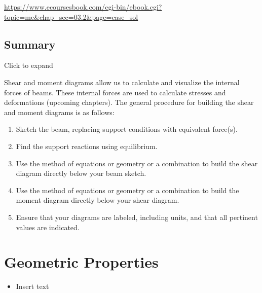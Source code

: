 \documentclass[
  letterpaper,
  DIV=11,
  numbers=noendperiod]{scrreprt}
\providecommand{\tightlist}{%
  \setlength{\itemsep}{0pt}\setlength{\parskip}{0pt}}\usepackage{longtable,booktabs,array}
\begin{document}
\url{https://www.ecoursesbook.com/cgi-bin/ebook.cgi?topic=me&chap_sec=03.2&page=case_sol}

\section*{Summary}\label{summary-3}


Click to expand

Shear and moment diagrams allow us to calculate and visualize the
internal forces of beams. These internal forces are used to calculate
stresses and deformations (upcoming chapters). The general procedure for
building the shear and moment diagrams is as follows:

\begin{enumerate}
\def\labelenumi{\arabic{enumi}.}
\tightlist
\item
  Sketch the beam, replacing support conditions with equivalent
  force(s).
\item
  Find the support reactions using equilibrium.
\item
  Use the method of equations or geometry or a combination to build the
  shear diagram directly below your beam sketch.
\item
  Use the method of equations or geometry or a combination to build the
  moment diagram directly below your shear diagram.
\item
  Ensure that your diagrams are labeled, including units, and that all
  pertinent values are indicated.
\end{enumerate}


\chapter{Geometric Properties}\label{sec-geometric-properties}

\begin{tcolorbox}[enhanced jigsaw, colback=white, colframe=quarto-callout-note-color-frame, leftrule=.75mm, opacitybacktitle=0.6, colbacktitle=quarto-callout-note-color!10!white, arc=.35mm, bottomrule=.15mm, breakable, title={Learning Objectives}, left=2mm, titlerule=0mm, toptitle=1mm, toprule=.15mm, opacityback=0, rightrule=.15mm, coltitle=black, bottomtitle=1mm]

\begin{itemize}
\tightlist
\item
  Insert text
\end{itemize}

\end{tcolorbox}
\end{document}
